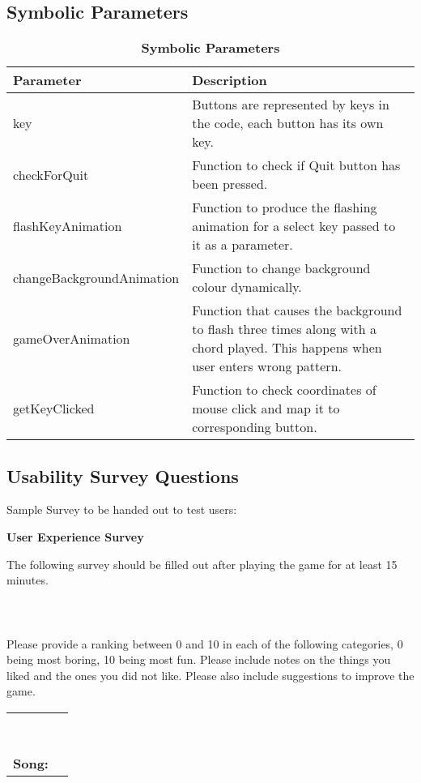 \documentclass[12pt, titlepage]{article}
\begin{document}
\subsection{Symbolic Parameters}
\begin{table}[h]
\caption{\bf Symbolic Parameters}
\begin{tabularx}{\textwidth}{p{6cm}X}
\toprule {\bf Parameter} & {\bf Description}\\
\midrule
key & Buttons are represented by keys in the code, each button has its own key.\\
checkForQuit & Function to check if Quit button has been pressed.\\
flashKeyAnimation & Function to produce the flashing animation for a select key passed to it as a parameter.\\
changeBackgroundAnimation & Function to change background colour dynamically.\\
gameOverAnimation & Function that causes the background to flash three times along with a chord played. This happens when user enters wrong pattern.\\
getKeyClicked & Function to check coordinates of mouse click and map it to corresponding button.\\
\bottomrule
\end{tabularx}
\end{table}

\subsection{Usability Survey Questions}
Sample Survey to be handed out to test users:
\begin{mdframed}[linewidth=1pt]
\begin{center}
{\bf \large User Experience Survey}\\[\baselineskip]
\end{center}
\noindent The following survey should be filled out after playing the game for at least 15 minutes.\\
\\
\\
\\
\noindent Please provide a ranking between 0 and 10 in each of the following categories, 0 being most boring, 10 being most fun.  Please include notes on the things you liked and the ones you did not like. Please also include suggestions to improve the game.\\[\baselineskip]
\noindent \begin{tabularx}{\textwidth}{@{}p{3.5cm}X@{}}
\noindent {\bf Entertainment:}\\
\\
\noindent {\bf Difficulty:}\\
\\
\noindent {\bf Appearance:}\\
\\
\noindent {\bf Sounds:}\\
\\
{\bf Song:} & \\[5\baselineskip]
\end{tabularx}
\end{mdframed}
\end{document}
